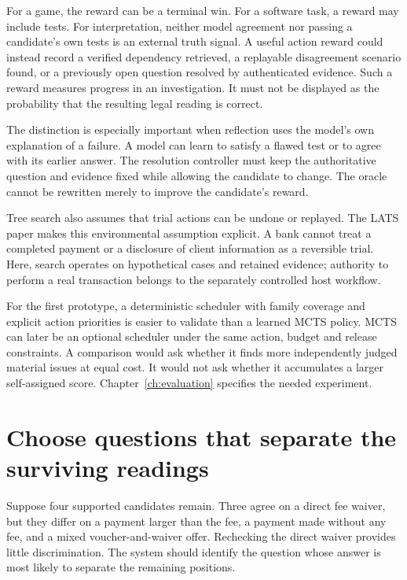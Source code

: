 \documentclass[12pt,a4paper,oneside,openany]{book}
\begin{document}
For a game, the reward can be a terminal win. For a software task, a reward may
include tests. For interpretation, neither model agreement nor passing a
candidate's own tests is an external truth signal. A useful action reward could
instead record a verified dependency retrieved, a replayable disagreement
scenario found, or a previously open question resolved by authenticated evidence.
Such a reward measures progress in an investigation. It must not be displayed as
the probability that the resulting legal reading is correct.

The distinction is especially important when reflection uses the model's own
explanation of a failure. A model can learn to satisfy a flawed test or to agree
with its earlier answer. The resolution controller must keep the authoritative
question and evidence fixed while allowing the candidate to change. The oracle
cannot be rewritten merely to improve the candidate's reward.

Tree search also assumes that trial actions can be undone or replayed.
The LATS paper makes this environmental assumption explicit. A bank
cannot treat a completed payment or a disclosure of client information
as a reversible trial. Here, search operates on hypothetical cases and
retained evidence; authority to perform a real transaction belongs to
the separately controlled host workflow.

For the first prototype, a deterministic scheduler with family coverage and
explicit action priorities is easier to validate than a learned MCTS policy.
MCTS can later be an optional scheduler under the same action, budget and release
constraints. A comparison would ask whether it finds more independently judged
material issues at equal cost. It would not ask whether it accumulates a larger
self-assigned score. Chapter~\ref{ch:evaluation} specifies the needed experiment.

\section{Choose questions that separate the surviving readings}
\label{merge:M05:08}


Suppose four supported candidates remain. Three agree on a direct fee waiver,
but they differ on a payment larger than the fee, a payment made without any fee,
and a mixed voucher-and-waiver offer. Rechecking the direct waiver provides
little discrimination. The system should identify the question whose answer is
most likely to separate the remaining positions.
\end{document}
